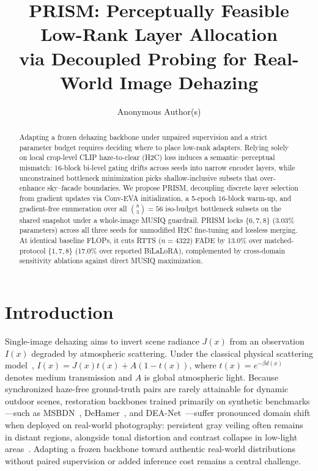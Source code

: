 \documentclass[10pt,twocolumn,letterpaper]{article}
\title{PRISM: Perceptually Feasible Low-Rank Layer Allocation\\via Decoupled Probing for Real-World Image Dehazing}
\author{Anonymous Author(s)}
\begin{document}
\maketitle
\raggedbottom

\begin{abstract}
Adapting a frozen dehazing backbone under unpaired supervision and a strict parameter budget requires deciding where to place low-rank adapters. Relying solely on local crop-level CLIP haze-to-clear (H2C) loss induces a semantic--perceptual mismatch: 16-block bi-level gating drifts across seeds into narrow encoder layers, while unconstrained bottleneck minimization picks shallow-inclusive subsets that over-enhance sky--facade boundaries. We propose PRISM, decoupling discrete layer selection from gradient updates via Conv-EVA initialization, a 5-epoch 16-block warm-up, and gradient-free enumeration over all $\binom{8}{3}=56$ iso-budget bottleneck subsets on the shared snapshot under a whole-image MUSIQ guardrail. PRISM locks $\{6,7,8\}$ (3.03\% parameters) across all three seeds for unmodified H2C fine-tuning and lossless merging. At identical baseline FLOPs, it cuts RTTS ($n=4322$) FADE by 13.0\% over matched-protocol $\{1,7,8\}$ (17.0\% over reported BiLaLoRA), complemented by cross-domain sensitivity ablations against direct MUSIQ maximization.
\par\smallskip{}
\end{abstract}

\section{Introduction}
Single-image dehazing aims to invert scene radiance $J(x)$ from an observation $I(x)$ degraded by atmospheric scattering. Under the classical physical scattering model~\cite{dcp2009,fattal2014}, $I(x) = J(x)t(x) + A(1 - t(x))$, where $t(x)=e^{-\beta d(x)}$ denotes medium transmission and $A$ is global atmospheric light. Because synchronized haze-free ground-truth pairs are rarely attainable for dynamic outdoor scenes, restoration backbones trained primarily on synthetic benchmarks---such as MSBDN~\cite{msbdn2020}, DeHamer~\cite{dehamer2022}, and DEA-Net~\cite{dea2024}---suffer pronounced domain shift when deployed on real-world photography: persistent gray veiling often remains in distant regions, alongside tonal distortion and contrast collapse in low-light areas~\cite{reside2019,dad2020,psd2021}. Adapting a frozen backbone toward authentic real-world distributions without paired supervision or added inference cost remains a central challenge.
\end{document}
